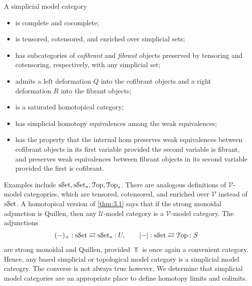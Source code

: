 \begin{lemma}\label{lma:3.7}
	A simplicial model category
	\begin{itemize}
		\item is complete and cocomplete;
		\item is tensored, cotensored, and enriched over simplicial sets;
		\item has subcategories of \emph{cofibrant} and \emph{fibrant} objects preserved by tensoring and cotensoring, respectively, with any simplicial set;
		\item admits a left deformation $Q$ into the cofibrant objects and a right deformation $R$ into the fibrant objects;
		\item is a saturated homotopical category;
		\item has simplicial homotopy equivalences among the weak equivalences;
		\item has the property that the internal hom preserves weak equivalences between cofibrant objects in its first variable provided the second variable is fibrant, and preserves weak equivalences between fibrant objects in its second variable provided the first is cofibrant.
	\end{itemize}
\end{lemma}
Examples include $\mathrm{s}\mathcal{S}\mathrm{et},\mathrm{s}\mathcal{S}\mathrm{et}_*,\mathcal{T}\mathrm{op} ,\mathcal{T}\mathrm{op} _*$. There are analogous definitions of $\mathcal{V} $-model categopries, which are tensored, cotensored, and enriched over $\mathcal{V} $ instead of $\mathrm{s}\mathcal{S}\mathrm{et}$. A homotopical version of \cref{thm:3.1} says that if the strong monoidal adjunction is Quillen, then any $\mathcal{U} $-model category is a $\mathcal{V} $-model category. The adjunctions
\[
	(-)_+ : \mathrm{s}\mathcal{S}\mathrm{et}\rightleftarrows \mathrm{s}\mathcal{S}\mathrm{et}_* : U,\qquad \left| - \right| : \mathrm{s}\mathcal{S}\mathrm{et} \rightleftarrows \mathcal{T}\mathrm{op} : S
\]
are strong monoidal and Quillen, provided $\Top $ is once again a convenient category. Hence, any based simplicial or topological model category is a simplicial model cateogry. The converse is not always true however. We determine that simplicial model categories are an appropriate place to define homotopy limits and colimits.
